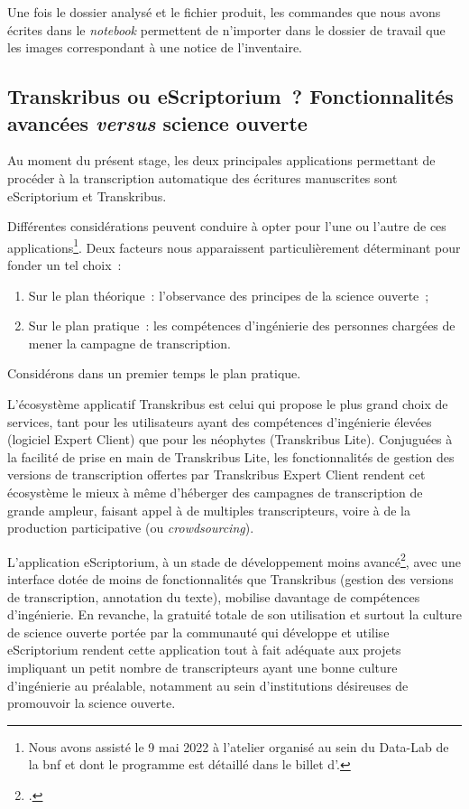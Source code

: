 \documentclass[a4paper,12pt,twoside]{book}
\begin{document}
				Une fois le dossier analysé et le fichier produit, les commandes que nous avons écrites dans le \textit{notebook} permettent de n'importer dans le dossier de travail que les images correspondant à une notice de l'inventaire.
			
						\subsection{Transkribus ou eScriptorium~? Fonctionnalités avancées \textit{versus} science ouverte}
			Au moment du présent stage, les deux principales applications permettant de procéder à la transcription automatique des écritures manuscrites sont eScriptorium et Transkribus.
			
			Différentes considérations peuvent conduire à opter pour l'une ou l'autre de ces applications\footnote{Nous avons assisté le 9 mai 2022 à l'atelier organisé au sein du Data-Lab de la \gls{bnf} et dont le programme est détaillé dans le billet d'\cite{jacquotTranskribusEScriptoriumTranscrire}.}. Deux facteurs nous apparaissent particulièrement déterminant pour fonder un tel choix~:
			
			\begin{enumerate}
				\item Sur le plan théorique~: l'observance des principes de la science ouverte~;
				\item Sur le plan pratique~: les compétences d'ingénierie des personnes chargées de mener la campagne de transcription.
			\end{enumerate}
			
			Considérons dans un premier temps le plan pratique.
			
			L'écosystème applicatif Transkribus est celui qui propose le plus grand choix de services, tant pour les utilisateurs ayant des compétences d'ingénierie élevées (logiciel Expert Client) que pour les néophytes (Transkribus Lite). Conjuguées à la facilité de prise en main de Transkribus Lite, les fonctionnalités de gestion des versions de transcription offertes par Transkribus Expert Client rendent cet écosystème le mieux à même d'héberger des campagnes de transcription de grande ampleur, faisant appel à de multiples transcripteurs, voire à de la production participative (ou \textit{crowdsourcing}).
			
			L'application eScriptorium, à un stade de développement moins avancé\footcite{stokesEScriptoriumVREManuscript2021}, avec une interface dotée de moins de fonctionnalités que Transkribus (gestion des versions de transcription, annotation du texte), mobilise davantage de compétences d'ingénierie. En revanche, la gratuité totale de son utilisation et surtout la culture de science ouverte portée par la communauté qui développe et utilise eScriptorium rendent cette application tout à fait adéquate aux projets impliquant un petit nombre de transcripteurs ayant une bonne culture d'ingénierie au préalable, notamment au sein d'institutions désireuses de promouvoir la science ouverte.
			
\end{document}
